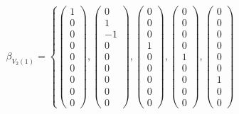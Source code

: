\documentclass{article}
\begin{document}
$$
\beta_{V_2(1)}=
\left\{
\left(\begin{array}{c}
    1 \\
    0 \\
    0 \\
    0 \\
    0 \\
    0 \\
    0 \\
    0 \\
    0
\end{array}\right)
,
\left(\begin{array}{c}
    0 \\
    1 \\
    -1 \\
    0 \\
    0 \\
    0 \\
    0 \\
    0 \\
    0
\end{array}\right)
,
\left(\begin{array}{c}
    0 \\
    0 \\
    0 \\
    1 \\
    0 \\
    0 \\
    0 \\
    0 \\
    0
\end{array}\right)
,
\left(\begin{array}{c}
    0 \\
    0 \\
    0 \\
    0 \\
    1 \\
    0 \\
    0 \\
    0 \\
    0
\end{array}\right)
,
\left(\begin{array}{c}
    0 \\
    0 \\
    0 \\
    0 \\
    0 \\
    0 \\
    1 \\
    0 \\
    0
\end{array}\right)
$$
\end{document}
